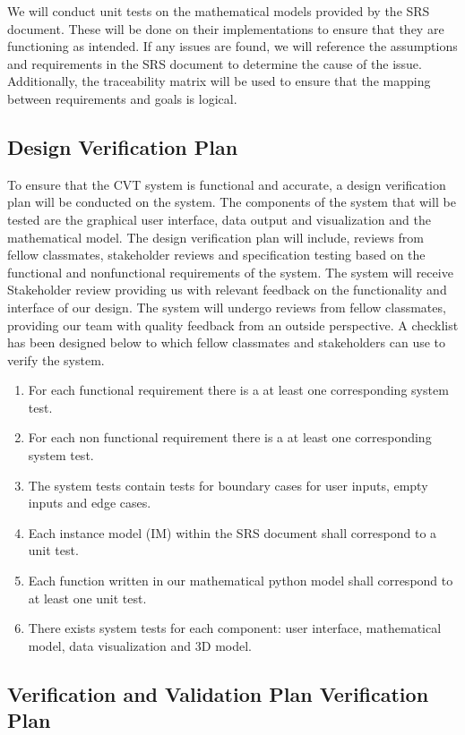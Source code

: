 \documentclass[12pt, titlepage]{article}
\begin{document}
We will conduct unit tests on the mathematical models provided by the SRS document.
These will be done on their implementations to ensure that they are functioning as intended.
If any issues are found, we will reference the assumptions and requirements in the SRS document to determine the cause of the issue.
Additionally, the traceability matrix will be used to ensure that the mapping between requirements and goals is logical. 

\subsection{Design Verification Plan}

\noindent To ensure that the CVT system is functional and accurate, a design verification plan will be conducted on the system. 
The components of the system that will be tested are the graphical user interface, data output and visualization and the mathematical model. 
The design verification plan will include, reviews from fellow classmates, stakeholder reviews and specification testing based on the functional and nonfunctional requirements of the system. 
The system will receive Stakeholder review providing us with relevant feedback on the functionality and interface of our design.
The system will undergo reviews from fellow classmates, providing our team with quality feedback from an outside perspective. 
A checklist has been designed below to which fellow classmates and stakeholders can use to verify the system.  


\begin{enumerate}
  \item For each functional requirement there is a at least one corresponding system test.
  \item For each non functional requirement there is a at least one corresponding system test.  
  \item The system tests contain tests for boundary cases for user inputs, empty inputs and edge cases. 
  \item Each instance model (IM) within the SRS document shall correspond to a unit test. 
  \item Each function written in our mathematical python model shall correspond to at least one unit test. 
  \item There exists system tests for each component: user interface, mathematical model, data visualization and 3D model. 
\end{enumerate}
\subsection{Verification and Validation Plan Verification Plan}
\end{document}
